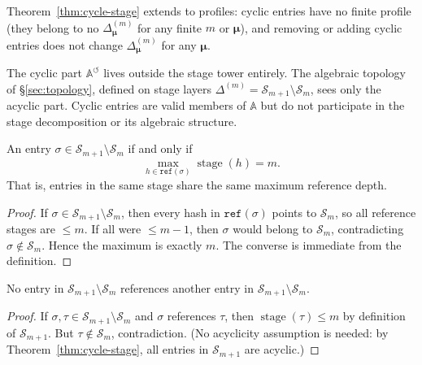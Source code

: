 \begin{remark}
Theorem~\ref{thm:cycle-stage} extends to profiles: cyclic entries have no finite profile (they belong to no $\Delta^{(m)}_{\boldsymbol{\mu}}$ for any finite $m$ or $\boldsymbol{\mu}$), and removing or adding cyclic entries does not change $\Delta^{(m)}_{\boldsymbol{\mu}}$ for any $\boldsymbol{\mu}$.
\end{remark}

The cyclic part $\mathbb{A}^{\circlearrowleft}$ lives outside the stage tower entirely. The algebraic topology of \S\ref{sec:topology}, defined on stage layers $\Delta^{(m)} = \mathcal{S}_{m+1} \setminus \mathcal{S}_m$, sees only the acyclic part. Cyclic entries are valid members of $\mathbb{A}$ but do not participate in the stage decomposition or its algebraic structure.

\begin{proposition}
\label{prop:same-stage}
An entry $\sigma \in \mathcal{S}_{m+1} \setminus \mathcal{S}_m$ if and only if
\[
\max_{h \in \texttt{ref}(\sigma)} \operatorname{stage}(h) = m.
\]
That is, entries in the same stage share the same maximum reference depth.
\end{proposition}

\begin{proof}
If $\sigma \in \mathcal{S}_{m+1} \setminus \mathcal{S}_m$, then every hash in $\texttt{ref}(\sigma)$ points to $\mathcal{S}_m$, so all reference stages are $\leq m$. If all were $\leq m-1$, then $\sigma$ would belong to $\mathcal{S}_m$, contradicting $\sigma \notin \mathcal{S}_m$. Hence the maximum is exactly $m$. The converse is immediate from the definition.
\end{proof}

\begin{proposition}
\label{prop:no-intra-stage}
No entry in $\mathcal{S}_{m+1} \setminus \mathcal{S}_m$ references another entry in $\mathcal{S}_{m+1} \setminus \mathcal{S}_m$.
\end{proposition}

\begin{proof}
If $\sigma, \tau \in \mathcal{S}_{m+1} \setminus \mathcal{S}_m$ and $\sigma$ references $\tau$, then $\operatorname{stage}(\tau) \leq m$ by definition of $\mathcal{S}_{m+1}$. But $\tau \notin \mathcal{S}_m$, contradiction. (No acyclicity assumption is needed: by Theorem~\ref{thm:cycle-stage}, all entries in $\mathcal{S}_{m+1}$ are acyclic.)
\end{proof}


